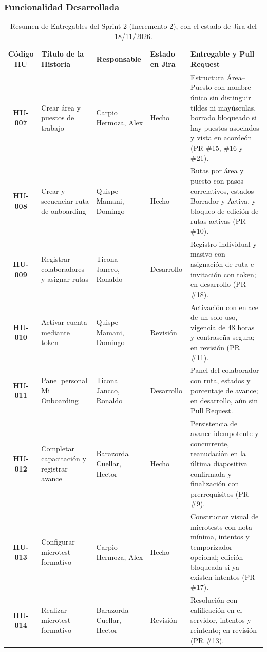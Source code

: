 \documentclass[11pt,a4paper]{article}
\begin{document}
\subsubsection{Funcionalidad Desarrollada}
\begin{table}[H]
\centering
\scriptsize
\renewcommand{\arraystretch}{1.2}
\begin{tabularx}{\linewidth}{|c|>{\raggedright\arraybackslash}p{3.3cm}|>{\raggedright\arraybackslash}p{2.5cm}|>{\raggedright\arraybackslash}p{1.6cm}|>{\raggedright\arraybackslash}X|}
\hline
\rowcolor{gray!15}
\textbf{Código HU} & \textbf{Título de la Historia} & \textbf{Responsable} & \textbf{Estado en Jira} & \textbf{Entregable y Pull Request} \\
\hline
\textbf{HU-007} & Crear área y puestos de trabajo & Carpio Hermoza, Alex & Hecho & Estructura Área--Puesto con nombre único sin distinguir tildes ni mayúsculas, borrado bloqueado si hay puestos asociados y vista en acordeón (PR \#15, \#16 y \#21). \\
\hline
\textbf{HU-008} & Crear y secuenciar ruta de onboarding & Quispe Mamani, Domingo & Hecho & Rutas por área y puesto con pasos correlativos, estados Borrador y Activa, y bloqueo de edición de rutas activas (PR \#10). \\
\hline
\textbf{HU-009} & Registrar colaboradores y asignar rutas & Ticona Jancco, Ronaldo & Desarrollo & Registro individual y masivo con asignación de ruta e invitación con token; en desarrollo (PR \#18). \\
\hline
\textbf{HU-010} & Activar cuenta mediante token & Quispe Mamani, Domingo & Revisión & Activación con enlace de un solo uso, vigencia de 48 horas y contraseña segura; en revisión (PR \#11). \\
\hline
\textbf{HU-011} & Panel personal Mi Onboarding & Ticona Jancco, Ronaldo & Desarrollo & Panel del colaborador con ruta, estados y porcentaje de avance; en desarrollo, aún sin Pull Request. \\
\hline
\textbf{HU-012} & Completar capacitación y registrar avance & Barazorda Cuellar, Hector & Hecho & Persistencia de avance idempotente y concurrente, reanudación en la última diapositiva confirmada y finalización con prerrequisitos (PR \#9). \\
\hline
\textbf{HU-013} & Configurar microtest formativo & Carpio Hermoza, Alex & Hecho & Constructor visual de microtests con nota mínima, intentos y temporizador opcional; edición bloqueada si ya existen intentos (PR \#17). \\
\hline
\textbf{HU-014} & Realizar microtest formativo & Barazorda Cuellar, Hector & Revisión & Resolución con calificación en el servidor, intentos y reintento; en revisión (PR \#13). \\
\hline
\end{tabularx}
\caption{Resumen de Entregables del Sprint 2 (Incremento 2), con el estado de Jira del 18/11/2026.}
\end{table}
\end{document}
